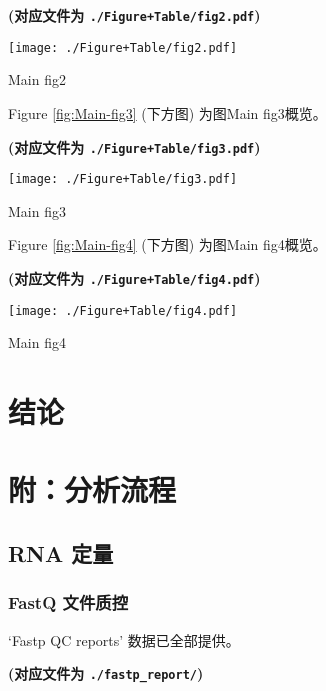 \documentclass[
]{article}
\begin{document}
\textbf{(对应文件为 \texttt{./Figure+Table/fig2.pdf})}

\def\@captype{figure}
\begin{center}
\texttt{[image: ./Figure+Table/fig2.pdf]}
\caption{Main fig2}\label{fig:Main-fig2}
\end{center}

Figure \ref{fig:Main-fig3} (下方图) 为图Main fig3概览。

\textbf{(对应文件为 \texttt{./Figure+Table/fig3.pdf})}

\def\@captype{figure}
\begin{center}
\texttt{[image: ./Figure+Table/fig3.pdf]}
\caption{Main fig3}\label{fig:Main-fig3}
\end{center}

Figure \ref{fig:Main-fig4} (下方图) 为图Main fig4概览。

\textbf{(对应文件为 \texttt{./Figure+Table/fig4.pdf})}

\def\@captype{figure}
\begin{center}
\texttt{[image: ./Figure+Table/fig4.pdf]}
\caption{Main fig4}\label{fig:Main-fig4}
\end{center}

\hypertarget{dis}{%
\section{结论}\label{dis}}

\hypertarget{workflow}{%
\section{附：分析流程}\label{workflow}}

\hypertarget{quant}{%
\subsection{RNA 定量}\label{quant}}

\hypertarget{fastq-ux6587ux4ef6ux8d28ux63a7}{%
\subsubsection{FastQ 文件质控}\label{fastq-ux6587ux4ef6ux8d28ux63a7}}

`Fastp QC reports' 数据已全部提供。

\textbf{(对应文件为 \texttt{./fastp\_report/})}
\end{document}
